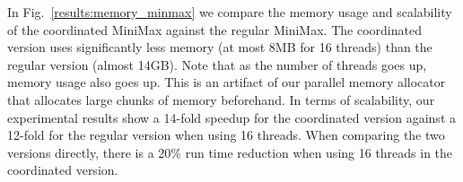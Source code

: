 In Fig.~\ref{results:memory_minmax} we compare the memory usage and scalability
of the coordinated MiniMax against the regular MiniMax. The coordinated version
uses significantly less memory (at most 8MB for 16 threads) than the regular
version (almost 14GB). Note that as the number of threads goes
up, memory usage also goes up. This is an artifact of our parallel memory
allocator that allocates large chunks of memory beforehand.
In terms of scalability, our experimental results show a 14-fold speedup for the
coordinated version against a 12-fold for the regular version when using 16
threads. When comparing the two versions directly, there is a 20\% run time
reduction when using 16 threads in the coordinated version.
